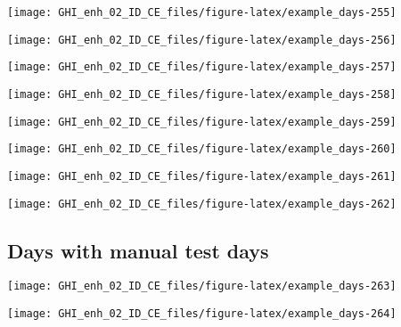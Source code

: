 \documentclass[
  10pt,
  a4paper,oneside]{article}
\begin{document}
\begin{center}\texttt{[image: GHI\_enh\_02\_ID\_CE\_files/figure-latex/example\_days-255]} \end{center}

\begin{center}\texttt{[image: GHI\_enh\_02\_ID\_CE\_files/figure-latex/example\_days-256]} \end{center}

\begin{center}\texttt{[image: GHI\_enh\_02\_ID\_CE\_files/figure-latex/example\_days-257]} \end{center}

\begin{center}\texttt{[image: GHI\_enh\_02\_ID\_CE\_files/figure-latex/example\_days-258]} \end{center}

\begin{center}\texttt{[image: GHI\_enh\_02\_ID\_CE\_files/figure-latex/example\_days-259]} \end{center}

\begin{center}\texttt{[image: GHI\_enh\_02\_ID\_CE\_files/figure-latex/example\_days-260]} \end{center}

\begin{center}\texttt{[image: GHI\_enh\_02\_ID\_CE\_files/figure-latex/example\_days-261]} \end{center}

\begin{center}\texttt{[image: GHI\_enh\_02\_ID\_CE\_files/figure-latex/example\_days-262]} \end{center}

\FloatBarrier

\hypertarget{days-with-manual-test-days}{%
\subsection{Days with manual test days}\label{days-with-manual-test-days}}

\begin{center}\texttt{[image: GHI\_enh\_02\_ID\_CE\_files/figure-latex/example\_days-263]} \end{center}

\begin{center}\texttt{[image: GHI\_enh\_02\_ID\_CE\_files/figure-latex/example\_days-264]} \end{center}
\end{document}
